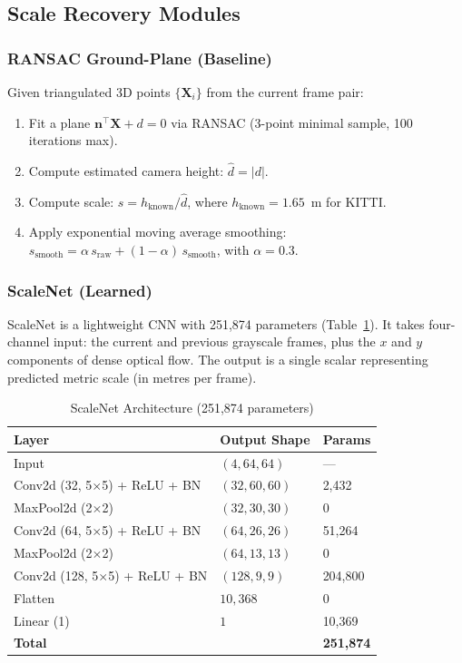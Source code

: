 \documentclass[12pt,a4paper]{article}
\begin{document}
\subsection{Scale Recovery Modules}

\subsubsection{RANSAC Ground-Plane (Baseline)}

Given triangulated 3D points $\{\mathbf{X}_i\}$ from the current frame pair:
\begin{enumerate}
    \item Fit a plane $\mathbf{n}^\top \mathbf{X} + d = 0$ via RANSAC (3-point minimal sample, 100 iterations max).
    \item Compute estimated camera height: $\hat{d} = |d|$.
    \item Compute scale: $s = h_{\text{known}} / \hat{d}$, where $h_{\text{known}} = 1.65$~m for KITTI.
    \item Apply exponential moving average smoothing: $s_{\text{smooth}} = \alpha\, s_{\text{raw}} + (1-\alpha)\, s_{\text{smooth}}$, with $\alpha = 0.3$.
\end{enumerate}

\subsubsection{ScaleNet (Learned)}

ScaleNet is a lightweight CNN with 251,874 parameters (Table~\ref{tab:scalenet_arch}). It takes four-channel input: the current and previous grayscale frames, plus the $x$ and $y$ components of dense optical flow. The output is a single scalar representing predicted metric scale (in metres per frame).

\begin{table}[h]
\centering
\caption{ScaleNet Architecture (251,874 parameters)}
\label{tab:scalenet_arch}
\begin{tabular}{lll}
\toprule
\textbf{Layer} & \textbf{Output Shape} & \textbf{Params} \\
\midrule
Input & $(4, 64, 64)$ & --- \\
Conv2d (32, 5$\times$5) + ReLU + BN & $(32, 60, 60)$ & 2,432 \\
MaxPool2d (2$\times$2) & $(32, 30, 30)$ & 0 \\
Conv2d (64, 5$\times$5) + ReLU + BN & $(64, 26, 26)$ & 51,264 \\
MaxPool2d (2$\times$2) & $(64, 13, 13)$ & 0 \\
Conv2d (128, 5$\times$5) + ReLU + BN & $(128, 9, 9)$ & 204,800 \\
Flatten & $10,368$ & 0 \\
Linear (1) & $1$ & 10,369 \\
\midrule
\textbf{Total} & & \textbf{251,874} \\
\bottomrule
\end{tabular}
\end{table}
\end{document}
